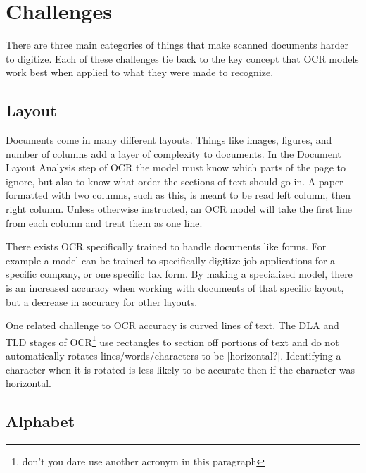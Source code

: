 \documentclass[sigplan,screen,nonacm]{acmart-tagged}
\begin{document}

\section{Challenges}
\label{sec:body}

There are three main categories of things that make scanned documents harder to digitize. Each of these challenges tie back to the key concept that OCR models work best when applied to what they were made to recognize.

\subsection{Layout}
\label{Layout}

Documents come in many different layouts. Things like images, figures, and number of columns add a layer of complexity to documents. 
In the Document Layout Analysis step of OCR the model must know which parts of the page to ignore, but also to know what order the sections of text should go in.
A paper formatted with two columns, such as this, is meant to be read left column, then right column. Unless otherwise instructed, an OCR model will take the first line from each column and treat them as one line. 

There exists OCR specifically trained to handle documents like forms. For example a model can be trained to specifically digitize job applications for a specific company, or one specific tax form. By making a specialized  model, there is an increased accuracy when working with documents of that specific layout, but a decrease in accuracy for other layouts. 

One related challenge to OCR accuracy is curved lines of text. The DLA and TLD stages of OCR\footnote{don't you dare use another acronym in this paragraph} use rectangles to section off portions of text and do not automatically rotates lines/words/characters to be [horizontal?]. Identifying a character when it is rotated is less likely to be accurate then if the character was horizontal. \citep{Fateh:2024}

\subsection{Alphabet}
\label{Alphabet}
\end{document}
